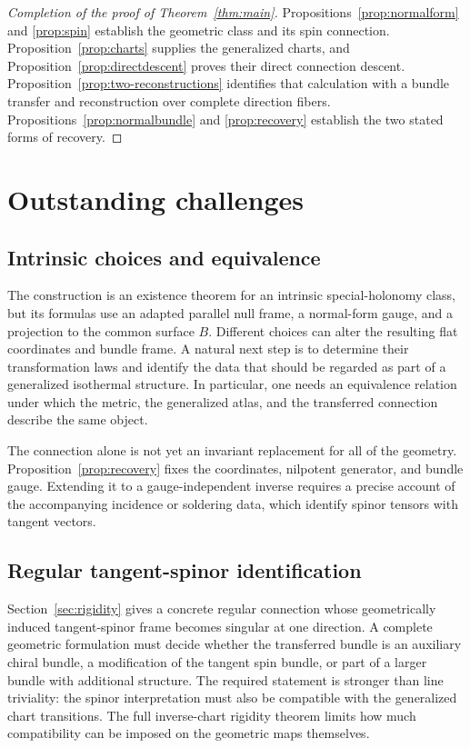 \documentclass[11pt]{article}
\numberwithin{equation}{section}
\theoremstyle{definition}
\theoremstyle{remark}
\begin{document}
\begin{proof}[Completion of the proof of Theorem~\ref{thm:main}]
Propositions~\ref{prop:normalform} and \ref{prop:spin} establish the geometric class and its spin connection. Proposition~\ref{prop:charts} supplies the generalized charts, and Proposition~\ref{prop:directdescent} proves their direct connection descent. Proposition~\ref{prop:two-reconstructions} identifies that calculation with a bundle transfer and reconstruction over complete direction fibers. Propositions~\ref{prop:normalbundle} and \ref{prop:recovery} establish the two stated forms of recovery.
\end{proof}

\section{Outstanding challenges}

\subsection{Intrinsic choices and equivalence}

The construction is an existence theorem for an intrinsic special-holonomy class, but its formulas use an adapted parallel null frame, a normal-form gauge, and a projection to the common surface $B$. Different choices can alter the resulting flat coordinates and bundle frame. A natural next step is to determine their transformation laws and identify the data that should be regarded as part of a generalized isothermal structure. In particular, one needs an equivalence relation under which the metric, the generalized atlas, and the transferred connection describe the same object.

The connection alone is not yet an invariant replacement for all of the geometry. Proposition~\ref{prop:recovery} fixes the coordinates, nilpotent generator, and bundle gauge. Extending it to a gauge-independent inverse requires a precise account of the accompanying incidence or soldering data, which identify spinor tensors with tangent vectors.

\subsection{Regular tangent-spinor identification}

Section~\ref{sec:rigidity} gives a concrete regular connection whose geometrically induced tangent-spinor frame becomes singular at one direction. A complete geometric formulation must decide whether the transferred bundle is an auxiliary chiral bundle, a modification of the tangent spin bundle, or part of a larger bundle with additional structure. The required statement is stronger than line triviality: the spinor interpretation must also be compatible with the generalized chart transitions. The full inverse-chart rigidity theorem limits how much compatibility can be imposed on the geometric maps themselves.
\end{document}
